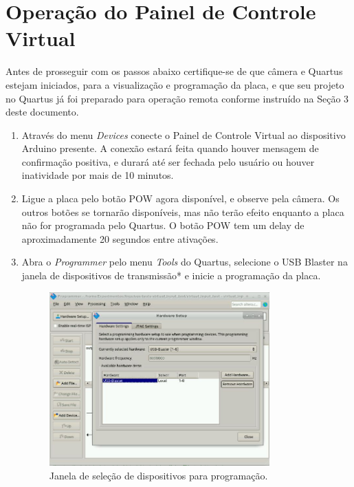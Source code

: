 \documentclass[12pt]{article}
\begin{document}
\section{Operação do Painel de Controle Virtual}
Antes de prosseguir com os passos abaixo certifique-se de que câmera e Quartus estejam iniciados, para a visualização e programação da placa, e que seu projeto no Quartus já foi preparado para operação remota conforme instruído na Seção 3 deste documento.

\begin{enumerate}[font=\bfseries]
    \item Através do menu \textit{Devices} conecte o Painel de Controle Virtual ao dispositivo Arduino presente. A conexão estará feita quando houver mensagem de confirmação positiva, e durará até ser fechada pelo usuário ou houver inatividade por mais de 10 minutos.

    \item Ligue a placa pelo botão POW agora disponível, e observe pela câmera.
    Os outros botões se tornarão disponíveis, mas não terão efeito enquanto a placa não for programada pelo Quartus.
    O botão POW tem um delay de aproximadamente 20 segundos entre ativações.

    \item Abra o \textit{Programmer} pelo menu \textit{Tools} do Quartus, selecione o USB Blaster na janela de dispositivos de transmissão* e inicie a programação da placa.
    
    \begin{figure}[H]
    \centering
    \includegraphics[width=0.8\textwidth]{img/usb-quartus.jpg}
    \caption{\label{ref:usb-quartus}Janela de seleção de dispositivos para programação.}
    \end{figure}


\end{enumerate}
\end{document}
